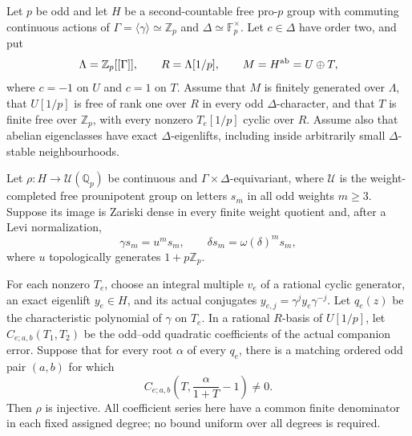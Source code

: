 \begin{lemma}\label{lem:rational-magnus}
Let $p$ be odd and let $H$ be a second-countable free pro-$p$ group
with commuting continuous actions of
$\Gamma=\langle\gamma\rangle\simeq\mathbb Z_p$ and
$\Delta\simeq\mathbb F_p^\times$. Let $c\in\Delta$ have order two,
and put
\[
 \Lambda=\mathbb Z_p[[\Gamma]],\qquad R=\Lambda[1/p],\qquad
 M=H^{\rm ab}=U\oplus T,
\]
where $c=-1$ on $U$ and $c=1$ on $T$. Assume that $M$ is finitely
generated over $\Lambda$, that $U[1/p]$ is free of rank one over $R$
in every odd $\Delta$-character, and that $T$ is finite free over
$\mathbb Z_p$, with every nonzero $T_e[1/p]$ cyclic over $R$.
Assume also that abelian eigenclasses have exact $\Delta$-eigenlifts,
including inside arbitrarily small $\Delta$-stable neighbourhoods.

Let $\rho:H\to\mathcal U(\mathbb Q_p)$ be continuous and
$\Gamma\times\Delta$-equivariant, where $\mathcal U$ is the
weight-completed free prounipotent group on letters $s_m$ in all odd
weights $m\ge3$. Suppose its image is Zariski dense in every finite
weight quotient and, after a Levi normalization,
\[
 \gamma s_m=u^m s_m,\qquad \delta s_m=\omega(\delta)^m s_m,
\]
where $u$ topologically generates $1+p\mathbb Z_p$.

For each nonzero $T_e$, choose an integral multiple $v_e$ of a rational
cyclic generator, an exact eigenlift $y_e\in H$, and its actual
conjugates $y_{e,j}=\gamma^j y_e\gamma^{-j}$. Let $q_e(z)$ be the
characteristic polynomial of $\gamma$ on $T_e$. In a rational
$R$-basis of $U[1/p]$, let $C_{e;a,b}(T_1,T_2)$ be the odd--odd
quadratic coefficients of the actual companion error. Suppose that
for every root $\alpha$ of every $q_e$, there is a matching ordered
odd pair $(a,b)$ for which
\[
 C_{e;a,b}\left(T,\frac{\alpha}{1+T}-1\right)\ne0.
                                                               \tag{GM.1}
\]
Then $\rho$ is injective. All coefficient series here have a common
finite denominator in each fixed assigned degree; no bound uniform
over all degrees is required.
\end{lemma}

